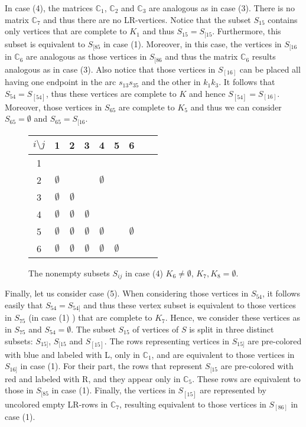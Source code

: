 \documentclass[12pt]{book}
\theoremstyle{plain}
\theoremstyle{remark}
\begin{document}
In case (4), the matrices $\mathbb{C}_1$, $\mathbb C_2$ and $\mathbb C_3$ are analogous as in case (3). There is no matrix $\mathbb C_7$ and thus there are no LR-vertices. Notice that the subset $S_{15}$ contains only vertices that are complete to $K_1$ and thus $S_{15} = S_{[15}$. Furthermore, this subset is equivalent to $S_{[85}$ in case (1).
Moreover, in this case, the vertices in $S_{[16}$ in $\mathbb C_6$ are analogous as those vertices in $S_{[86}$ and thus the matrix $\mathbb C_6$ results analogous as in case (3).
Also notice that those vertices in $S_{[16]}$ can be placed all having one endpoint in the arc $s_{13} s_{35}$ and the other in $k_1 k_3$. It follows that $S_{54} = S_{[54]}$, thus these vertices are complete to $K$ and hence $S_{[54]}= S_{[16]}$. Moreover, those vertices in $S_{65}$ are complete to $K_5$ and thus we can consider $S_{65} = \emptyset$ and $S_{65} = S_{[16}$.

\begin{figure}[h!]	 
\begin{center}
	\begin{tabular}{ c | c c c c c c c c} 
		 \hline
		 $i\setminus j$ & 1 & 2 & 3 & 4 & 5 & 6 \\ 
		  \hline
		 1 & \checkmark & \checkmark & \checkmark & \checkmark & \checkmark & \checkmark \\ 
		 2 & $\emptyset$ & \checkmark & \checkmark & $\emptyset$ & \checkmark & \checkmark \\
 		 3 & $\emptyset$ & $\emptyset$ & \checkmark & \checkmark & \checkmark & \checkmark \\
		 4 & $\emptyset$ & $\emptyset$ & $\emptyset$ & \checkmark & \checkmark & \checkmark \\
		 5 & $\emptyset$ & $\emptyset$ & $\emptyset$ & $\emptyset$ & \checkmark & $\emptyset$ \\
		 6 & $\emptyset$  & $\emptyset$  & $\emptyset$  & $\emptyset$  & $\emptyset$ & \checkmark \\
	\end{tabular}
\end{center} 
\caption{The nonempty subsets $S_{ij}$ in case (4) $K_6 \neq \emptyset$, $K_7, K_8 = \emptyset$.} \label{fig:tabla_co4tent_4}
\end{figure}

Finally, let us consider case (5). When considering those vertices in $S_{54}$, it follows easily that $S_{54} = S_{54]}$ and thus these vertex subset is equivalent to those vertices in $S_{75}$ (in case (1) ) that are complete to $K_7$. Hence, we consider these vertices as in $S_{75}$ and $S_{54} = \emptyset$.
The subset $S_{15}$ of vertices of $S$ is split in three distinct subsets: $S_{15]}$, $S_{[15}$ and $S_{[15]}$. The rows representing vertices in $S_{15]}$ are pre-colored with blue and labeled with L, only in $\mathbb C_1$, and are equivalent to those vertices in $S_{16]}$ in case (1). For their part, the rows that represent $S_{[15}$ are pre-colored with red and labeled with R, and they appear only in $\mathbb C_5$. These rows are equivalent to those in $S_{[85}$ in case (1). Finally, the vertices in $S_{[15]}$ are represented by uncolored empty LR-rows in $\mathbb C_7$, resulting equivalent to those vertices in $S_{[86]}$ in case (1).
\end{document}
